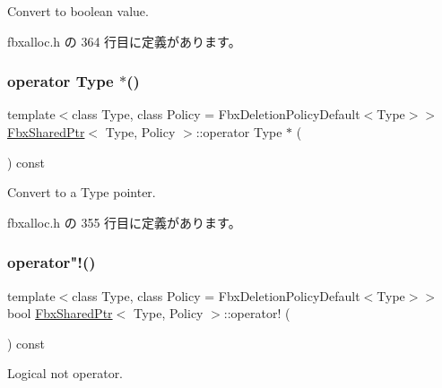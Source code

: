 Convert to boolean value. 



 fbxalloc.\+h の 364 行目に定義があります。

\mbox{\label{class_fbx_shared_ptr_a4204201633921f32c564bd9329fe78fb}} 
\subsubsection{\texorpdfstring{operator Type $\ast$()}{operator Type *()}}
{\footnotesize\ttfamily template$<$class Type, class Policy = Fbx\+Deletion\+Policy\+Default$<$\+Type$>$$>$ \\
\hyperlink{class_fbx_shared_ptr}{Fbx\+Shared\+Ptr}$<$ Type, Policy $>$\+::operator Type $\ast$ (\begin{DoxyParamCaption}{ }\end{DoxyParamCaption}) const\hspace{0.3cm}{\ttfamily [inline]}}



Convert to a Type pointer. 



 fbxalloc.\+h の 355 行目に定義があります。

\mbox{\label{class_fbx_shared_ptr_ac52a41b234d83cb8fa5deb75e740d950}} 
\subsubsection{\texorpdfstring{operator"!()}{operator!()}}
{\footnotesize\ttfamily template$<$class Type, class Policy = Fbx\+Deletion\+Policy\+Default$<$\+Type$>$$>$ \\
bool \hyperlink{class_fbx_shared_ptr}{Fbx\+Shared\+Ptr}$<$ Type, Policy $>$\+::operator! (\begin{DoxyParamCaption}{ }\end{DoxyParamCaption}) const\hspace{0.3cm}{\ttfamily [inline]}}



Logical not operator. 



